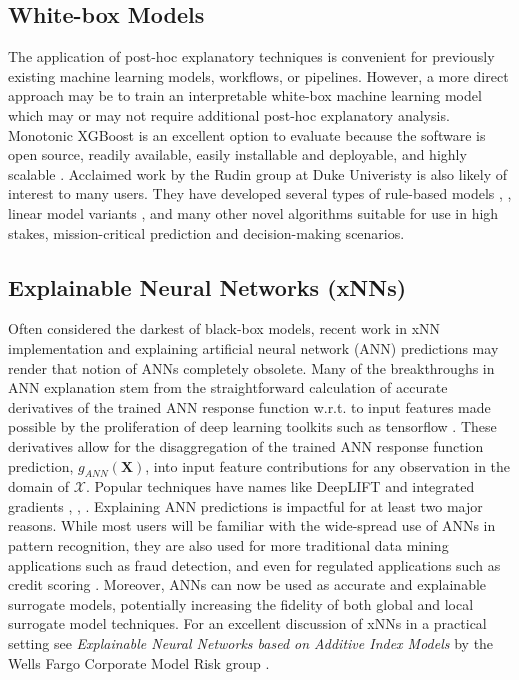 \documentclass[11pt]{asaproc}
\begin{document}
\subsection{White-box Models}

The application of post-hoc explanatory techniques is convenient for previously existing machine learning models, workflows, or pipelines. However, a more direct approach may be to train an interpretable white-box machine learning model which may or may not require additional post-hoc explanatory analysis. Monotonic XGBoost is an excellent option to evaluate because the software is open source, readily available, easily installable and deployable, and highly scalable \cite{xgboost}. Acclaimed work by the Rudin group at Duke Univeristy is also likely of interest to many users. They have developed several types of rule-based models \cite{corels}, \cite{sbrl}, linear model variants \cite{slim}, and many other novel algorithms suitable for use in high stakes, mission-critical prediction and decision-making scenarios. 

\subsection{Explainable Neural Networks (xNNs)}

Often considered the darkest of black-box models, recent work in xNN implementation and explaining artificial neural network (ANN) predictions may render that notion of ANNs completely obsolete. Many of the breakthroughs in ANN explanation stem from the straightforward calculation of accurate derivatives of the trained ANN response function w.r.t. to input features made possible by the proliferation of deep learning toolkits such as tensorflow \cite{raissi2017physics}. These derivatives allow for the disaggregation of the trained ANN response function prediction, $g_{ANN}(\mathbf{X})$, into input feature contributions for any observation in the domain of $\mathcal{X}$. Popular techniques have names like DeepLIFT and integrated gradients \cite{deeplift}, \cite{integrated_grads}, \cite{grad_attr}. Explaining ANN predictions is impactful for at least two major reasons. While most users will be familiar with the wide-spread use of ANNs in pattern recognition, they are also used for more traditional data mining applications such as fraud detection, and even for regulated applications such as credit scoring \cite{mli_booklet}. Moreover, ANNs can now be used as accurate and explainable surrogate models, potentially increasing the fidelity of both global and local surrogate model techniques. For an excellent discussion of xNNs in a practical setting see \textit{Explainable Neural Networks based on Additive Index Models} by the Wells Fargo Corporate Model Risk group \cite{wf_xnn}.
\end{document}
